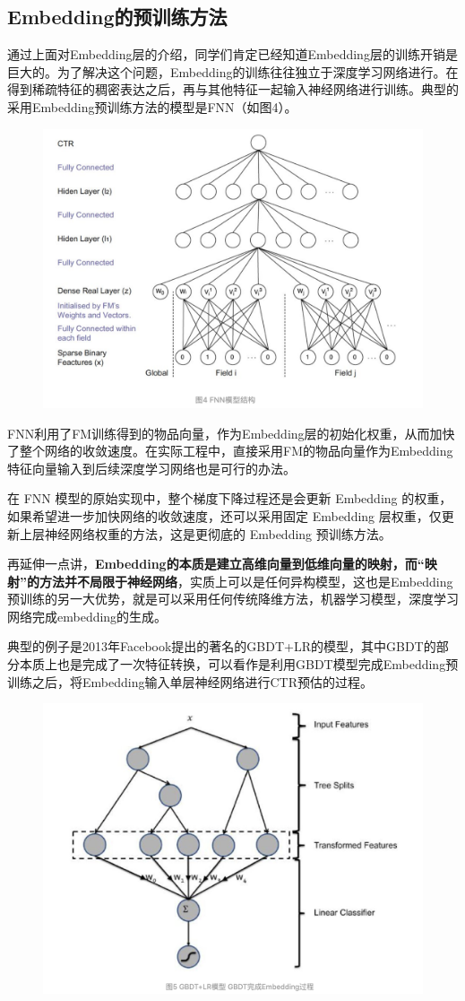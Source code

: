 \documentclass[12pt]{article}
\begin{document}
\subsection{Embedding的预训练方法}
通过上面对Embedding层的介绍，同学们肯定已经知道Embedding层的训练开销是巨大的。为了解决这个问题，Embedding的训练往往独立于深度学习网络进行。在得到稀疏特征的稠密表达之后，再与其他特征一起输入神经网络进行训练。典型的采用Embedding预训练方法的模型是FNN（如图4）。
\begin{figure}[H]
    \centering
    \includegraphics[width=.8\textwidth]{fig/FNN_Structure.png}
\end{figure}

FNN利用了FM训练得到的物品向量，作为Embedding层的初始化权重，从而加快了整个网络的收敛速度。在实际工程中，直接采用FM的物品向量作为Embedding特征向量输入到后续深度学习网络也是可行的办法。

在 FNN 模型的原始实现中，整个梯度下降过程还是会更新 Embedding 的权重，如果希望进一步加快网络的收敛速度，还可以采用固定 Embedding 层权重，仅更新上层神经网络权重的方法，这是更彻底的 Embedding 预训练方法。

再延伸一点讲，\textbf{Embedding的本质是建立高维向量到低维向量的映射，而“映射”的方法并不局限于神经网络}，实质上可以是任何异构模型，这也是Embedding预训练的另一大优势，就是可以采用任何传统降维方法，机器学习模型，深度学习网络完成embedding的生成。

典型的例子是2013年Facebook提出的著名的GBDT+LR的模型，其中GBDT的部分本质上也是完成了一次特征转换，可以看作是利用GBDT模型完成Embedding预训练之后，将Embedding输入单层神经网络进行CTR预估的过程。

\begin{figure}[H]
    \centering
    \includegraphics[width=.6\textwidth]{fig/Embedding_GBDT_LR.png}
\end{figure}
\end{document}
